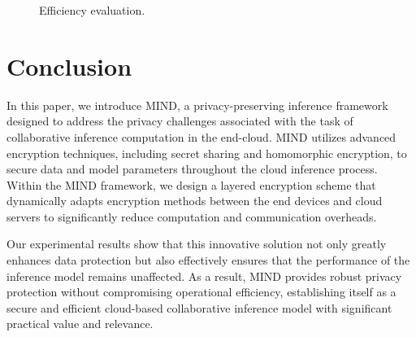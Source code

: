 \documentclass[conference]{IEEEtran}
\begin{document}
\begin{figure}[ht]
     \hspace{2pt}
    \caption{Efficiency evaluation.}
    \label{fig:efficiency}
\end{figure}

\section{Conclusion}
In this paper, we introduce MIND, a privacy-preserving inference framework designed to address the privacy challenges associated with the task of collaborative inference computation in the end-cloud. MIND utilizes advanced encryption techniques, including secret sharing and homomorphic encryption, to secure data and model parameters throughout the cloud inference process. Within the MIND framework, we design a layered encryption scheme that dynamically adapts encryption methods between the end devices and cloud servers to significantly reduce computation and communication overheads.

Our experimental results show that this innovative solution not only greatly enhances data protection but also effectively ensures that the performance of the inference model remains unaffected. As a result, MIND provides robust privacy protection without compromising operational efficiency, establishing itself as a secure and efficient cloud-based collaborative inference model with significant practical value and relevance.
\end{document}
